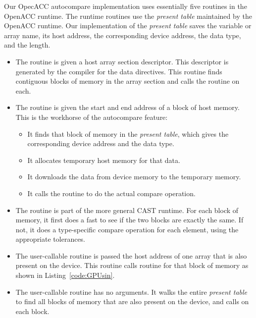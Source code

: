 Our OpecACC autocompare implementation uses essentially five routines in the OpenACC runtime.
The runtime routines use the \emph{present table}\cite{wolfe.ashes.17} maintained by the OpenACC runtime.
Our implementation of the \emph{present table} saves the variable or array name, its host address, the corresponding device address, the data type, and the length.
\begin{itemize}
\item The  routine is given a host array section descriptor.
This descriptor is generated by the compiler for the data directives.
This routine finds contiguous blocks of memory in the array section and calls the  routine on each.
\item The  routine is given the start and end address of a block of host memory.
This is the workhorse of the autocompare feature:
\begin{itemize}
\item It finds that block of memory in the \emph{present table}, which gives the corresponding device address and the data type.
\item It allocates temporary host memory for that data.
\item It downloads the data from device memory to the temporary memory.
\item It calls the  routine to do the actual compare operation.
\end{itemize}
\item The  routine is part of the more general CAST runtime.
For each block of memory, it first does a fast  to see if the two blocks are exactly the same.
If not, it does a type-specific compare operation for each element, using the appropriate tolerances.

\item The user-callable  routine is passed the host address of one array that is also present on the device.
This routine calls  routine for that block of memory as shown in Listing~\ref{code:GPUsin}.
\item The user-callable  routine has no arguments.
It walks the entire \emph{present table} to find all blocks of memory that are also present on the device, and calls  on each block.
\end{itemize}

